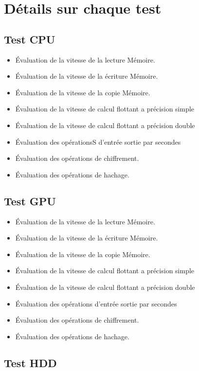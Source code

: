 \documentclass[french]{article}
\begin{document}
\section{Détails sur chaque test}
\subsection{Test CPU}
\begin{itemize}
\item Évaluation de la vitesse de la lecture Mémoire. 
\item Évaluation de la vitesse de la écriture Mémoire. 
\item Évaluation de la vitesse de la copie Mémoire. 
\item Évaluation de la vitesse de calcul flottant a précision simple 
\item Évaluation de la vitesse de calcul flottant a précision double 
\item Évaluation des opérationsS d'entrée sortie par secondes 
\item Évaluation des opérations de chiffrement. 
\item Évaluation des opérations de hachage.

\end{itemize}
\subsection{Test GPU}
\begin{itemize}
\item Évaluation de la vitesse de la lecture Mémoire. 
\item Évaluation de la vitesse de la écriture Mémoire. 
\item Évaluation de la vitesse de la copie Mémoire. 
\item Évaluation de la vitesse de calcul flottant a précision simple 
\item Évaluation de la vitesse de calcul flottant a précision double 
\item Évaluation des opérations d'entrée sortie par secondes 
\item Évaluation des opérations de chiffrement. 
\item Évaluation des opérations de hachage.

\end{itemize}
\subsection{Test HDD}
\end{document}
